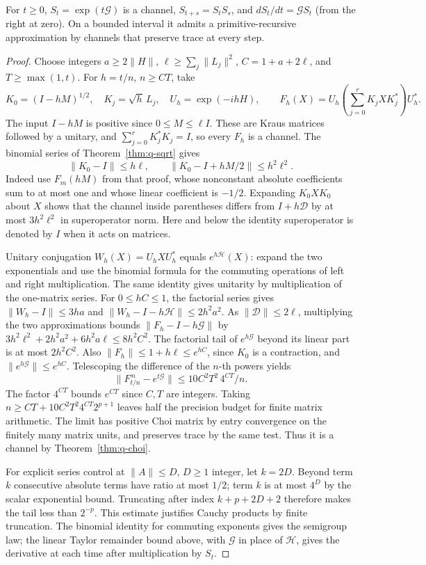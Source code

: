 \begin{theorem}\label{thm:q-lindblad}
For \(t\ge0\), \(S_t=\exp(t\mathcal G)\) is a channel,
\(S_{t+s}=S_t S_s\), and \(d S_t/dt=\mathcal G S_t\) (from the right
at zero). On a bounded interval it admits a primitive-recursive
approximation by channels that preserve trace at every step.
\end{theorem}
\begin{proof}
Choose integers \(a\ge2\|H\|\), \(\ell\ge\sum_j\|L_j\|^2\),
\(C=1+a+2\ell\), and \(T\ge\max(1,t)\).
For \(h=t/n\), \(n\ge CT\), take
\[
 K_0=(I-hM)^{1/2},\quad K_j=\sqrt h\,L_j,\quad
 U_h=\exp(-ihH),\qquad
 F_h(X)=U_h\left(\sum_{j=0}^{r}K_j X K_j^*\right)U_h^* .
\]
The input \(I-hM\) is positive since \(0\le M\le\ell I\). These
are Kraus matrices followed by a unitary, and
\(\sum_{j=0}^r K_j^*K_j=I\), so every \(F_h\) is a channel.
The binomial series of Theorem~\ref{thm:q-sqrt} gives
\[
 \|K_0-I\|\le h\ell,\qquad
 \|K_0-I+hM/2\|\le h^2\ell^2 .
\]
Indeed use \(F_m(hM)\) from that proof, whose nonconstant absolute
coefficients sum to at most one and whose linear coefficient is
\(-1/2\). Expanding \(K_0XK_0\) about \(X\) shows that the channel
inside parentheses differs from \(I+h\mathcal D\) by at most
\(3h^2\ell^2\) in superoperator norm. Here and below the identity
superoperator is denoted by \(I\) when it acts on matrices.

Unitary conjugation \(W_h(X)=U_hXU_h^*\) equals \(e^{h\mathcal H}(X)\):
expand the two exponentials and use the binomial formula for the
commuting operations of left and right multiplication. The same
identity gives unitarity by multiplication of the one-matrix series.
For \(0\le hC\le1\), the factorial series gives
\(\|W_h-I\|\le3ha\) and
\(\|W_h-I-h\mathcal H\|\le2h^2a^2\).
As \(\|\mathcal D\|\le2\ell\), multiplying the two approximations
bounds \(\|F_h-I-h\mathcal G\|\) by
\(3h^2\ell^2+2h^2a^2+6h^2a\ell\le 8h^2 C^2\).
The factorial tail of \(e^{h\mathcal G}\) beyond its linear part is
at most \(2h^2 C^2\). Also \(\|F_h\|\le1+h\ell\le e^{hC}\), since
\(K_0\) is a contraction, and \(\|e^{h\mathcal G}\|\le e^{hC}\).
Telescoping the difference of the \(n\)-th powers yields
\[
             \|F_{t/n}^{\,n}-e^{t\mathcal G}\|
               \le 10 C^2T^2\,4^{CT}/n .
\]
The factor \(4^{CT}\) bounds \(e^{CT}\) since \(C,T\) are integers.
Taking \(n\ge CT+10C^2T^2 4^{CT}2^{p+1}\) leaves half the precision
budget for finite matrix arithmetic. The limit has positive Choi
matrix by entry convergence on the finitely many matrix units, and
preserves trace by the same test. Thus it is a channel by
Theorem~\ref{thm:q-choi}.

For explicit series control at \(\|A\|\le D\), \(D\ge1\) integer,
let \(k=2D\). Beyond term \(k\) consecutive absolute terms have ratio
at most \(1/2\); term \(k\) is at most \(4^D\) by the scalar
exponential bound. Truncating after index \(k+p+2D+2\) therefore
makes the tail less than \(2^{-p}\). This estimate justifies
Cauchy products by finite truncation. The binomial identity for
commuting exponents gives the semigroup law; the linear Taylor
remainder bound above, with \(\mathcal G\) in place of \(\mathcal H\),
gives the derivative at each time after multiplication by \(S_t\).
\end{proof}

